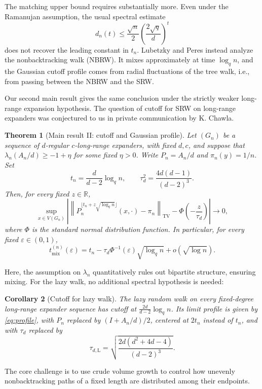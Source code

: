 \documentclass[11pt,reqno]{amsart}
\newtheorem{theorem}{Theorem}[section]
\newtheorem{corollary}[theorem]{Corollary}
\theoremstyle{definition}
\newcommand{\mix}{\mathrm{mix}}
\begin{document}
The matching upper bound requires substantially more.
Even under the Ramanujan assumption, the usual spectral estimate
\[
 d_n(t)\le\frac{\sqrt n}{2}
 \left(\frac{2\sqrt q}{d}\right)^t
\]
does not recover the leading constant in $t_n$. Lubetzky and Peres instead analyze the nonbacktracking walk (NBRW). It mixes approximately at time $\log_q n$, and the Gaussian cutoff profile comes from radial fluctuations of the tree walk, i.e., from passing between the NBRW and the SRW.

Our second main result gives the same conclusion under the
strictly weaker long-range expansion hypothesis. The question of cutoff for SRW on long-range expanders was conjectured to us in private communication by K. Chawla. 

\begin{theorem}[Main result II: cutoff and Gaussian profile]\label{thm:main}
Let $(G_n)$ be a sequence of $d$-regular $c$-long-range
expanders, with fixed $d,c$, and suppose that
$\lambda_n(A_n/d)\ge-1+\eta$ for some fixed $\eta>0$.
Write $P_n=A_n/d$ and $\pi_n(y)=1/n$.
Set
\[
 t_n=\frac{d}{d-2}\log_q n,
 \qquad
 \tau_d^2=\frac{4d(d-1)}{(d-2)^3}.
\]
Then, for every fixed $z\in\mathbb R$,
\begin{equation}\label{eq:profile}
 \sup_{x\in V(G_n)}
 \left|
 \left\|P_n^{\lfloor t_n+z\sqrt{\log_q n}\rfloor}
                  (x,\cdot)-\pi_n\right\|_{\mathrm{TV}}
 -\Phi\left(-\frac{z}{\tau_d}\right)
 \right|
 \longrightarrow0,
\end{equation}
where $\Phi$ is the standard normal distribution function.
In particular, for every fixed $\varepsilon\in(0,1)$,
\[
 t_{\mix}^{(n)}(\varepsilon)
 =t_n-\tau_d\Phi^{-1}(\varepsilon)\sqrt{\log_q n}
   +o(\sqrt{\log n}).
\]
\end{theorem}

Here, the assumption on $\lambda_n$ quantitatively rules out bipartite structure, ensuring mixing. For the lazy walk, no additional spectral hypothesis is needed:
\begin{corollary}[Cutoff for lazy walk]\label{cor:lazy}
The lazy random walk on every fixed-degree long-range expander sequence has 
cutoff at $\frac{2d}{d-2}\log_q n$. Its limit profile is given by \eqref{eq:profile}, with $P_n$ replaced by $(I+A_n/d)/2$, centered at $2t_n$ instead of $t_n$, and with $\tau_d$ replaced by
\[
    \tau_{d,\mathrm L}=\sqrt{\frac{2d(d^2+4d-4)}{(d-2)^3}}.
\]
\end{corollary}


The core challenge is to use crude volume growth to control how unevenly nonbacktracking paths of a fixed length are distributed among their endpoints.
\end{document}
